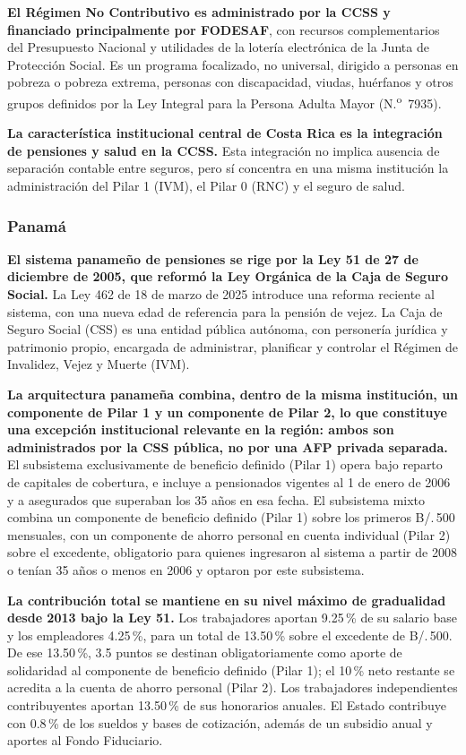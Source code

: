 \documentclass[12pt, letterpaper]{article}
\begin{document}
\textbf{El Régimen No Contributivo es administrado por la CCSS y financiado principalmente por FODESAF}, con recursos complementarios del Presupuesto Nacional y utilidades de la lotería electrónica de la Junta de Protección Social. Es un programa focalizado, no universal, dirigido a personas en pobreza o pobreza extrema, personas con discapacidad, viudas, huérfanos y otros grupos definidos por la Ley Integral para la Persona Adulta Mayor (N.\textsuperscript{o}~7935).

\textbf{La característica institucional central de Costa Rica es la integración de pensiones y salud en la CCSS.} Esta integración no implica ausencia de separación contable entre seguros, pero sí concentra en una misma institución la administración del Pilar 1 (IVM), el Pilar 0 (RNC) y el seguro de salud.

\subsubsection{Panamá}

\textbf{El sistema panameño de pensiones se rige por la Ley 51 de 27 de diciembre de 2005, que reformó la Ley Orgánica de la Caja de Seguro Social.} La Ley 462 de 18 de marzo de 2025 introduce una reforma reciente al sistema, con una nueva edad de referencia para la pensión de vejez. La Caja de Seguro Social (CSS) es una entidad pública autónoma, con personería jurídica y patrimonio propio, encargada de administrar, planificar y controlar el Régimen de Invalidez, Vejez y Muerte (IVM).

\textbf{La arquitectura panameña combina, dentro de la misma institución, un componente de Pilar 1 y un componente de Pilar 2, lo que constituye una excepción institucional relevante en la región: ambos son administrados por la CSS pública, no por una AFP privada separada.} El subsistema exclusivamente de beneficio definido (Pilar 1) opera bajo reparto de capitales de cobertura, e incluye a pensionados vigentes al 1 de enero de 2006 y a asegurados que superaban los 35 años en esa fecha. El subsistema mixto combina un componente de beneficio definido (Pilar 1) sobre los primeros B/.\,500 mensuales, con un componente de ahorro personal en cuenta individual (Pilar 2) sobre el excedente, obligatorio para quienes ingresaron al sistema a partir de 2008 o tenían 35 años o menos en 2006 y optaron por este subsistema.

\textbf{La contribución total se mantiene en su nivel máximo de gradualidad desde 2013 bajo la Ley 51.} Los trabajadores aportan 9.25\,\% de su salario base y los empleadores 4.25\,\%, para un total de 13.50\,\% sobre el excedente de B/.\,500. De ese 13.50\,\%, 3.5 puntos se destinan obligatoriamente como aporte de solidaridad al componente de beneficio definido (Pilar 1); el 10\,\% neto restante se acredita a la cuenta de ahorro personal (Pilar 2). Los trabajadores independientes contribuyentes aportan 13.50\,\% de sus honorarios anuales. El Estado contribuye con 0.8\,\% de los sueldos y bases de cotización, además de un subsidio anual y aportes al Fondo Fiduciario.
\end{document}

